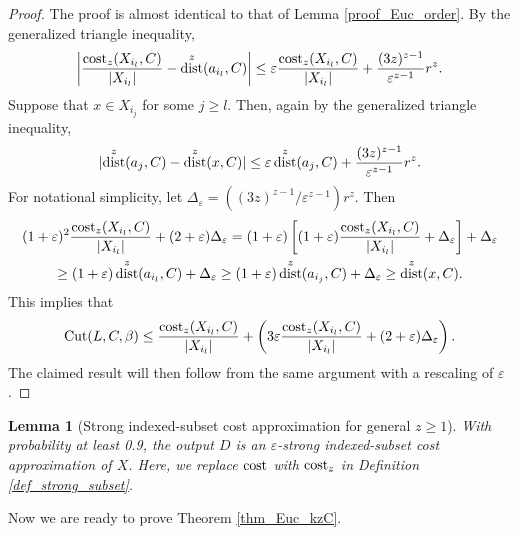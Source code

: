 \documentclass[11pt,letterpaper]{article}
\newtheorem{lemma}[theorem]{Lemma}
\theoremstyle{definition}
\newcommand{\eps}{\varepsilon}
\DeclareMathOperator{\dist}{dist}
\DeclarePairedDelimiter{\abs}{\lvert}{\rvert}
\begin{document}
\begin{proof}

    The proof is almost identical to that of Lemma \ref{proof_Euc_order}. By the generalized triangle inequality,
\[
\abs*{\frac{\cost_z(X_{i_l},C)}{\abs{X_{i_l}}} - \dist^z(a_{i_l},C) } \leq \eps\frac{\cost_z(X_{i_l},C)}{\abs{X_{i_l}}} + \frac{(3z)^{z-1}}{\eps^{z-1}} r^{z}.
\]
Suppose that $x\in X_{i_j}$ for some $j\geq l$. Then, again by the generalized triangle inequality,
\[
	\abs{\dist^z(a_j, C) - \dist^z(x, C)} \leq \eps \dist^z(a_j, C) + \frac{(3z)^{z-1}}{\eps^{z-1}} r^{z}.
\]
For notational simplicity, let $\Delta_\eps = ((3z)^{z-1}/\eps^{z-1}) r^{z}$. Then
\begin{multline*}
		 (1+\eps)^2\frac{\cost_z(X_{i_l},C)}{\abs{X_{i_l}}} + (2+\eps)\Delta_\eps
	=	 (1+\eps)\left[ (1+\eps)\frac{\cost_z(X_{i_l},C)}{\abs{X_{i_l}}} + \Delta_\eps \right] + \Delta_\eps \\
	\geq (1+\eps)\dist^z(a_{i_l},C) + \Delta_\eps
	\geq (1+\eps)\dist^z(a_{i_j},C) + \Delta_\eps
	\geq \dist^z(x,C).
\end{multline*}
This implies that
\[
	\operatorname{Cut}(L,C,\beta) \leq \frac{\cost_z(X_{i_l},C)}{\abs{X_{i_l}}} + \left(3\eps\frac{\cost_z(X_{i_l},C)}{\abs{X_{i_l}}} + (2+\eps)\Delta_\eps\right).
\]
The claimed result will then follow from the same argument with a rescaling of $\eps$.
\end{proof}


\begin{lemma}[Strong indexed-subset cost approximation for general $z\geq 1$]
\label{lm:strong_kzC}
With probability at least 0.9, the output $D$ is an $\eps$-strong indexed-subset cost approximation of $X$.
%
Here, we replace $\cost$ with $\cost_z$ in Definition \ref{def_strong_subset}.
\end{lemma}

Now we are ready to prove Theorem \ref{thm_Euc_kzC}.
\end{document}
